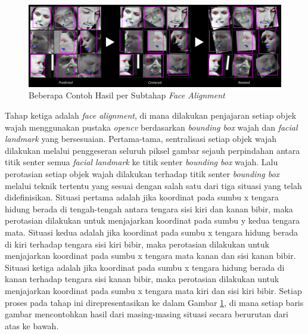 \begin{figure}
    \centering
    \includegraphics[width=14cm]{gambar/proses_face_alignment.png}
    \caption{Beberapa Contoh Hasil per Subtahap \textit{Face Alignment}}
    \label{fig:prosesfacealignment}
\end{figure}
Tahap ketiga adalah \textit{face alignment}, di mana dilakukan penjajaran setiap objek wajah menggunakan pustaka \textit{opencv} berdasarkan \textit{bounding box} wajah dan \textit{facial landmark} yang bersesuaian. Pertama-tama, sentralisasi setiap objek wajah dilakukan melalui penggeseran seluruh piksel gambar sejauh perpindahan antara titik senter semua \textit{facial landmark} ke titik senter \textit{bounding box} wajah. Lalu perotasian setiap objek wajah dilakukan terhadap titik senter \textit{bounding box} melalui teknik tertentu yang sesuai dengan salah satu dari tiga situasi yang telah didefinisikan. Situasi pertama adalah jika koordinat pada sumbu x tengara hidung berada di tengah-tengah antara tengara sisi kiri dan kanan bibir, maka perotasian dilakukan untuk menjajarkan koordinat pada sumbu y kedua tengara mata. Situasi kedua adalah jika koordinat pada sumbu x tengara hidung berada di kiri terhadap tengara sisi kiri bibir, maka perotasian dilakukan untuk menjajarkan koordinat pada sumbu x tengara mata kanan dan sisi kanan bibir. Situasi ketiga adalah jika koordinat pada sumbu x tengara hidung berada di kanan terhadap tengara sisi kanan bibir, maka perotasian dilakukan untuk menjajarkan koordinat pada sumbu x tengara mata kiri dan sisi kiri bibir. Setiap proses pada tahap ini direpresentasikan ke dalam Gambar \ref{fig:prosesfacealignment}, di mana setiap baris gambar mencontohkan hasil dari masing-masing situasi secara berurutan dari atas ke bawah.

